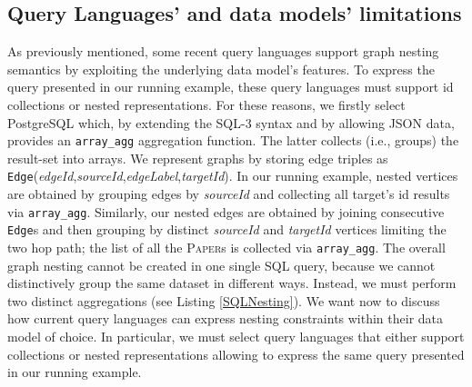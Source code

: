 \subsection{Query Languages' and data models' limitations}\label{subsec:pathsumm}
As previously mentioned, some recent  query languages support graph nesting semantics by exploiting the underlying data model's features. To express the query presented in our running example, these query languages must support id collections or nested representations.
For these reasons, we firstly select PostgreSQL which, by extending the SQL-3 syntax and by allowing JSON data, provides an \texttt{array\_agg} aggregation function. The latter collects (i.e., groups) the result-set into arrays.  We  represent  graphs by  storing edge triples as \texttt{Edge}(\textit{edgeId},\;\textit{sourceId},\;\textit{edgeLabel},\;\textit{targetId}).
In our running example, nested vertices  are obtained by 
grouping edges by \textit{sourceId} and collecting all target's id results via \texttt{array\_agg}. Similarly, our nested edges are obtained by joining consecutive \texttt{Edge}s and then grouping  by  distinct \textit{sourceId} and \textit{targetId}  vertices limiting the two hop path; the list of all the \textsc{Paper}s is collected via \texttt{array\_agg}. The overall graph nesting cannot be created in one single SQL query, because we cannot distinctively group the same dataset in different ways. Instead, we must perform two distinct aggregations (see Listing \ref{SQLNesting}).
We want now to discuss how current query languages can express nesting constraints within their data model of choice. In particular, we must select query languages that either support collections or nested representations allowing to express the same query presented in our running example. 



